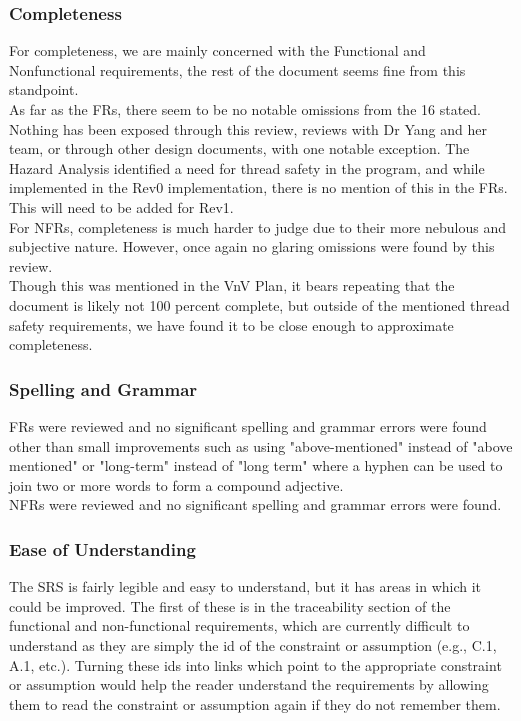 \documentclass[12pt, titlepage]{article}
\begin{document}
\subsubsection{Completeness}
For completeness, we are mainly concerned with the Functional and Nonfunctional requirements, the rest of the document seems fine from this standpoint.\\

As far as the FRs, there seem to be no notable omissions from the 16 stated. Nothing has been exposed through this review, reviews with Dr Yang and her team, or through other
design documents, with one notable exception. The Hazard Analysis identified a need for thread safety in the program, and while implemented in the Rev0 implementation, there
is no mention of this in the FRs. This will need to be added for Rev1.\\

For NFRs, completeness is much harder to judge due to their more nebulous and subjective nature. However, once again no glaring omissions were found by this review.\\

Though this was mentioned in the VnV Plan, it bears repeating that the document is likely not 100 percent complete, but outside of the mentioned thread safety requirements, we
have found it to be close enough to approximate completeness.\\

\subsubsection{Spelling and Grammar}
FRs were reviewed and no significant spelling and grammar errors were found other than small improvements such as using "above-mentioned" instead of "above mentioned" or "long-term" instead of "long term" where a hyphen can be used to join two or more words to form a compound adjective.\\

NFRs were reviewed and no significant spelling and grammar errors were found.

\subsubsection{Ease of Understanding}
The SRS is fairly legible and easy to understand, but it has areas in which it could be improved. The first of these is in the traceability section of the functional and non-functional requirements, which are currently difficult to understand as they are simply the id of the constraint or assumption (e.g., C.1, A.1, etc.). Turning these ids into links which point to the appropriate constraint or assumption would help the reader understand the requirements by allowing them to read the constraint or assumption again if they do not remember them.
\end{document}
